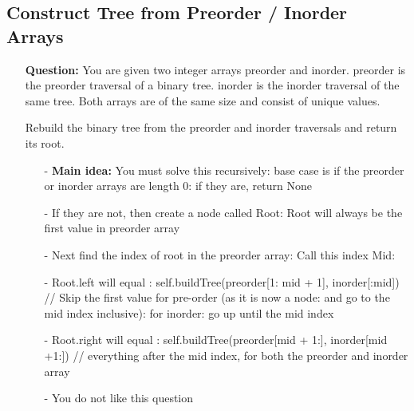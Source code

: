 \documentclass[12pt]{article}
\begin{document}
\subsection{Construct Tree from Preorder / Inorder Arrays}
\begin{enumerate}
  \item[] \textbf{Question:} You are given two integer arrays preorder and inorder. preorder is the preorder traversal of a binary tree. inorder is the inorder traversal of the same tree. Both arrays are of the same size and consist of unique values.

Rebuild the binary tree from the preorder and inorder traversals and return its root.

    \begin{enumerate}
      \item[-] \textbf{Main idea:} You must solve this recursively: base case is if the preorder or inorder arrays are length 0: if they are, return None
      \item[-] If they are not, then create a node called Root: Root will always be the first value in preorder array
      \item[-] Next find the index of root in the preorder array: Call this index Mid:
      \item[-] Root.left will equal : self.buildTree(preorder[1: mid + 1], inorder[:mid]) // Skip the first value for pre-order (as it is now a node: and go to the mid index inclusive): for inorder: go up until the mid index
      \item[-] Root.right will equal : self.buildTree(preorder[mid + 1:], inorder[mid +1:]) // everything after the mid index, for both the preorder and inorder array
      \item[-] You do not like this question


    \end{enumerate}
\end{enumerate}
\end{document}
